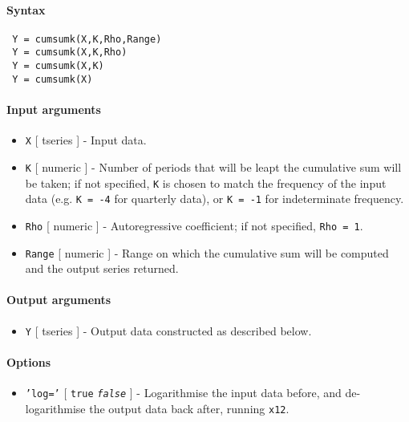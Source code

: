 


	\paragraph{Syntax}
 
 \begin{verbatim}
 Y = cumsumk(X,K,Rho,Range)
 Y = cumsumk(X,K,Rho)
 Y = cumsumk(X,K)
 Y = cumsumk(X)
 \end{verbatim}
 
 \paragraph{Input arguments}
 
 \begin{itemize}
 \item
   \texttt{X} {[} tseries {]} - Input data.
 \item
   \texttt{K} {[} numeric {]} - Number of periods that will be leapt the
   cumulative sum will be taken; if not specified, \texttt{K} is chosen
   to match the frequency of the input data (e.g. \texttt{K = -4} for
   quarterly data), or \texttt{K = -1} for indeterminate frequency.
 \item
   \texttt{Rho} {[} numeric {]} - Autoregressive coefficient; if not
   specified, \texttt{Rho = 1}.
 \item
   \texttt{Range} {[} numeric {]} - Range on which the cumulative sum
   will be computed and the output series returned.
 \end{itemize}
 
 \paragraph{Output arguments}
 
 \begin{itemize}
 \item
   \texttt{Y} {[} tseries {]} - Output data constructed as described
   below.
 \end{itemize}
 
 \paragraph{Options}
 
 \begin{itemize}
 \item
   \texttt{'log='} {[} \texttt{true} \textbar{} \emph{\texttt{false}} {]}
   - Logarithmise the input data before, and de-logarithmise the output
   data back after, running \texttt{x12}.
 \end{itemize}
 
